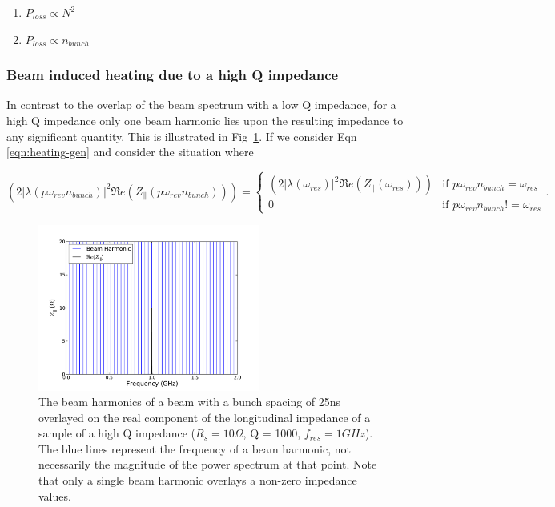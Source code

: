 \begin{enumerate}
\item{$P_{loss} \propto N^{2}$}
\item{$P_{loss} \propto n_{bunch}$}
\end{enumerate}

\subsubsection{Beam induced heating due to a high Q impedance}

In contrast to the overlap of the beam spectrum with a low Q impedance, for a high Q impedance only one beam harmonic lies upon the resulting impedance to any significant quantity. This is illustrated in Fig~\ref{fig:high_q_harmonics}. If we consider Eqn \ref{eqn:heating-gen} and consider the situation where

\begin{equation}
\left( 2 \left| \lambda \left(p \omega_{rev}n_{bunch} \right)  \right|^{2}  \Re{}e \left( Z_{\parallel} \left(p \omega_{rev}n_{bunch}\right) \right) \right) = 
\begin{cases}
\left( 2 \left| \lambda \left( \omega_{res} \right)  \right|^{2}  \Re{}e \left( Z_{\parallel} \left( \omega_{res} \right) \right) \right) &\textrm{if $p \omega_{rev} n_{bunch} = \omega_{res}$}\\
0								&\textrm{if $p \omega_{rev} n_{bunch} != \omega_{res}$}
\end{cases}
\label{eqn:single_harmonic_profile}.
\end{equation}

\begin{figure}
\begin{center}
\includegraphics[width=0.65\textwidth]{Wakefields_and_Impedances/figures/high_q_1000_resonance_beam_harmonics.pdf}
\end{center}
\caption{The beam harmonics of a beam with a bunch spacing of 25ns overlayed on the real component of the longitudinal impedance of a sample of a high Q impedance ($R_{s}=10\Omega$, Q = 1000, $f_{res}=1GHz$). The blue lines represent the frequency of a beam harmonic, not necessarily the magnitude of the power spectrum at that point. Note that only a single beam harmonic overlays a non-zero impedance values.}
\label{fig:high_q_harmonics}
\end{figure}

